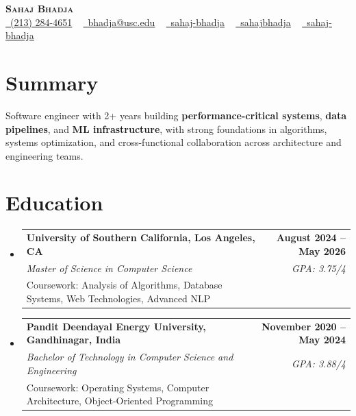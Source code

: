 \documentclass[letterpaper,10pt]{article}
\makeatletter
\newcommand{\resumeEduSubheading}[5]{\vspace{-1pt}\item\begin{tabular*}{1.0\textwidth}[t]{l@{\extracolsep{\fill}}r}\textbf{#1} & \textbf{\small #2} \\\textit{\small #3} & \textit{\small #4} \\\small #5 & \\\end{tabular*}\vspace{-4pt}}
\newcommand{\resumeSubHeadingListStart}{\begin{itemize}[leftmargin=0.0in, label={}]}
\newcommand{\resumeSubHeadingListEnd}{\end{itemize}}
\makeatother
\begin{document}
\begin{center}
{\Huge \scshape \textbf{Sahaj Bhadja}} \\ \vspace{1pt}
\small \href{tel:(213) 284-4651}{\faPhone\ \underline{(213) 284-4651}} ~ \href{mailto: bhadja@usc.edu}{\raisebox{-0.2\height}\faEnvelope\ \underline{bhadja@usc.edu}} ~
\href{https://www.linkedin.com/in/sahaj-bhadja/}{\raisebox{-0.2\height}\faLinkedin\ \underline{sahaj-bhadja}} ~ \href{https://github.com/SAHAJ-BHADJA}{\raisebox{-0.2\height}\faGithub\ \underline{sahajbhadja}} ~
\href{https://sahaj-bhadja.vercel.app/}{\raisebox{-0.2\height}\faGlobe\ \underline{sahaj-bhadja}}
\end{center}
\vspace{-18pt}
\section{Summary}
\begin{itemize}[leftmargin=0.15in, label={}]
\small{\item{Software engineer with 2+ years building \textbf{performance-critical systems}, \textbf{data pipelines}, and \textbf{ML infrastructure}, with strong foundations in algorithms, systems optimization, and cross-functional collaboration across architecture and engineering teams.}}
\end{itemize}
\vspace{-16pt}
\section{Education}
\resumeSubHeadingListStart
\resumeEduSubheading{University of Southern California, Los Angeles, CA}{August 2024 -- May 2026}{Master of Science in Computer Science}{GPA: 3.75/4}{Coursework: Analysis of Algorithms, Database Systems, Web Technologies, Advanced NLP}
\vspace{-9pt}
\resumeEduSubheading{Pandit Deendayal Energy University, Gandhinagar, India}{November 2020 -- May 2024}{Bachelor of Technology in Computer Science and Engineering}{GPA: 3.88/4}{Coursework: Operating Systems, Computer Architecture, Object-Oriented Programming}
\resumeSubHeadingListEnd
\vspace{-14pt}
\end{document}
